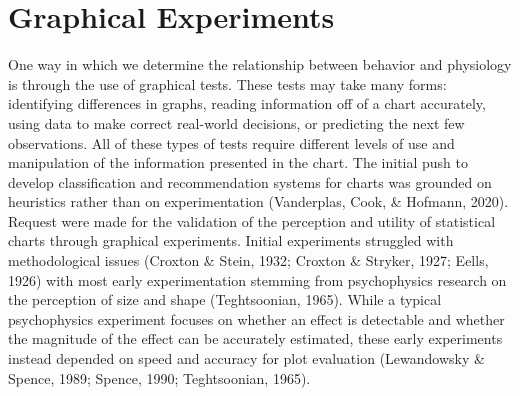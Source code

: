 \documentclass[print]{nuthesis}
\begin{document}
\hypertarget{graphical-experiments}{%
\section{Graphical Experiments}\label{graphical-experiments}}

One way in which we determine the relationship between behavior and physiology is through the use of graphical tests.
These tests may take many forms: identifying differences in graphs, reading information
off of a chart accurately, using data to make correct real-world decisions, or predicting the next few observations.
All of these types of tests require different levels of use and manipulation of the information presented in the chart.
The initial push to develop classification and recommendation systems for charts was grounded on heuristics rather than on experimentation (Vanderplas, Cook, \& Hofmann, 2020).
Request were made for the validation of the perception and utility of statistical charts through graphical experiments.
Initial experiments struggled with methodological issues (Croxton \& Stein, 1932; Croxton \& Stryker, 1927; Eells, 1926) with most early experimentation stemming from psychophysics research on the perception of size and shape (Teghtsoonian, 1965).
While a typical psychophysics experiment focuses on whether an effect is detectable and whether the magnitude of the effect can be accurately estimated, these early experiments instead depended on speed and accuracy for plot evaluation (Lewandowsky \& Spence, 1989; Spence, 1990; Teghtsoonian, 1965). 
\end{document}
